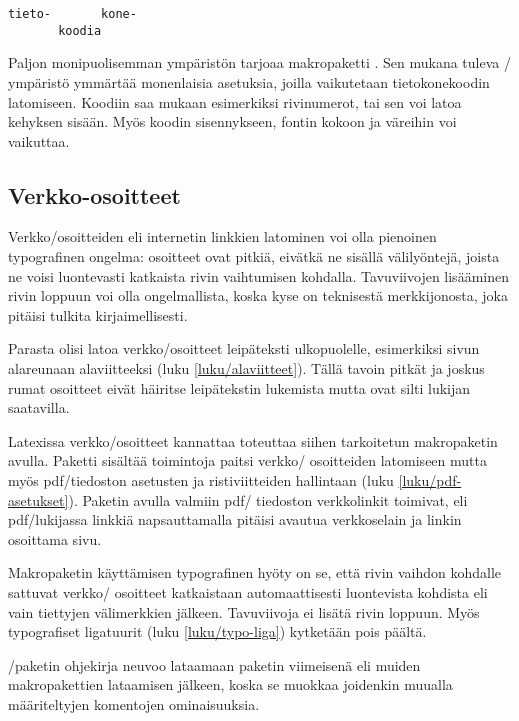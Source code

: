 \begin{tulossis}
\begin{verbatim}
tieto-       kone-
       koodia
\end{verbatim}
\end{tulossis}

Paljon monipuolisemman ympäristön tarjoaa makropaketti
. Sen mukana tuleva
\-/ ympäristö ymmärtää monenlaisia asetuksia,
joilla vaikutetaan tietokonekoodin latomiseen. Koodiin saa mukaan
esimerkiksi rivinumerot, tai sen voi latoa kehyksen sisään. Myös koodin
sisennykseen, fontin kokoon ja väreihin voi vaikuttaa.

\subsection{Verkko-osoitteet}

Verkko\-/osoitteiden eli internetin linkkien latominen voi olla
pienoinen typografinen ongelma: osoitteet ovat pitkiä, eivätkä ne
sisällä välilyöntejä, joista ne voisi luontevasti katkaista rivin
vaihtumisen kohdalla. Tavuviivojen lisääminen rivin loppuun voi olla
ongelmallista, koska kyse on teknisestä merkkijonosta, joka pitäisi
tulkita kirjaimellisesti.

Parasta olisi latoa verkko\-/osoitteet leipäteksti ulkopuolelle,
esimerkiksi sivun alareunaan alaviitteeksi (luku
\ref{luku/alaviitteet}). Tällä tavoin pitkät ja joskus rumat osoitteet
eivät häiritse leipätekstin lukemista mutta ovat silti lukijan
saatavilla.

Latexissa verkko\-/osoitteet kannattaa toteuttaa siihen tarkoitetun
makropaketin avulla. Paketti 
sisältää toimintoja paitsi verkko\-/ osoitteiden latomiseen mutta myös
pdf\-/tiedoston asetusten ja ristiviitteiden hallintaan (luku
\ref{luku/pdf-asetukset}). Paketin avulla valmiin pdf\-/ tiedoston
verkkolinkit toimivat, eli pdf\-/lukijassa linkkiä napsauttamalla
pitäisi avautua verkkoselain ja linkin osoittama sivu.

Makropaketin käyttämisen typografinen hyöty on se, että rivin vaihdon
kohdalle sattuvat verkko\-/ osoitteet katkaistaan automaattisesti
luontevista kohdista eli vain tiettyjen välimerkkien jälkeen.
Tavuviivoja ei lisätä rivin loppuun. Myös typografiset ligatuurit (luku
\ref{luku/typo-liga}) kytketään pois päältä.

\-/paketin ohjekirja neuvoo lataamaan paketin
viimeisenä eli muiden makropakettien lataamisen jälkeen, koska se
muokkaa joidenkin muualla määriteltyjen komentojen ominaisuuksia.

